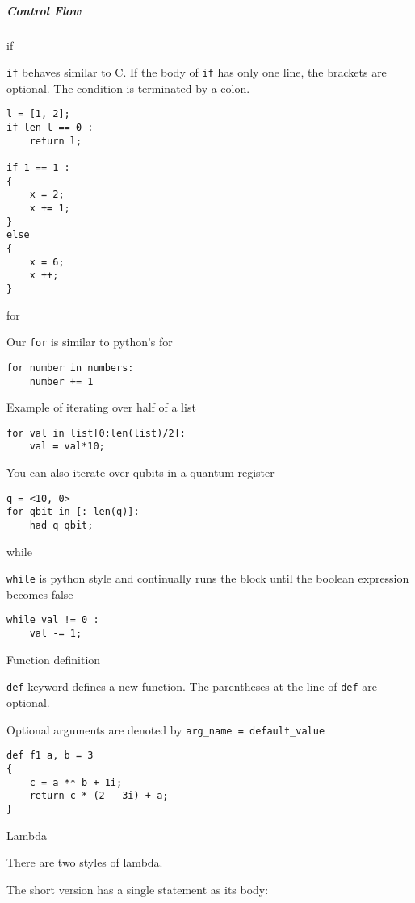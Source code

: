 \documentclass[]{article}
\begin{document}
\subparagraph{Control Flow}\label{control-flow}

if

\texttt{if} behaves similar to C. If the body of \texttt{if} has only
one line, the brackets are optional. The condition is terminated by a
colon.

\begin{verbatim}
l = [1, 2];
if len l == 0 :
    return l;

if 1 == 1 :
{
    x = 2;
    x += 1;
}
else
{
    x = 6;
    x ++;
}
\end{verbatim}

for

Our \texttt{for} is similar to python's for

\begin{verbatim}
for number in numbers:
    number += 1
\end{verbatim}

Example of iterating over half of a list

\begin{verbatim}
for val in list[0:len(list)/2]:
    val = val*10;
\end{verbatim}

You can also iterate over qubits in a quantum register

\begin{verbatim}
q = <10, 0>
for qbit in [: len(q)]:
    had q qbit;
\end{verbatim}

while

\texttt{while} is python style and continually runs the block until the
boolean expression becomes false

\begin{verbatim}
while val != 0 :
    val -= 1;
\end{verbatim}

Function definition

\texttt{def} keyword defines a new function. The parentheses at the line
of \texttt{def} are optional.

Optional arguments are denoted by \texttt{arg\_name = default\_value}

\begin{verbatim}
def f1 a, b = 3
{
    c = a ** b + 1i;
    return c * (2 - 3i) + a;
}
\end{verbatim}

Lambda

There are two styles of lambda.

The short version has a single statement as its body:
\end{document}
